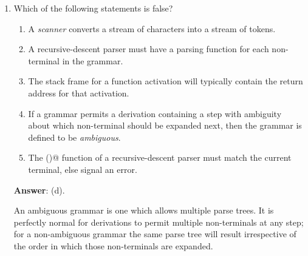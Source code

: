 \documentclass[12pt]{article}
\begin{document}
\begin{enumerate}
(a) and (c) cannot be acceptable since regexp's cannot describe
balanced constructs of arbitrary length, (d) does not allow $n = 0$
while (e) requires even $n$.

\item Which of the following statements is false?

\begin{enumerate}

\item A \textit{scanner} converts a stream of characters into a stream of tokens.

\item A recursive-descent parser must have a parsing function for each
  non-terminal in the grammar.

\item The stack frame for a function activation will typically contain
  the return address for that activation.

\item If a grammar permits a derivation containing a step with
  ambiguity about which non-terminal should be expanded next, then
  the grammar is defined to be \textit{ambiguous}.

\item The \verb@match()@ function of a recursive-descent parser must
match the current terminal, else signal an error.

\end{enumerate}

\textbf{Answer}: (d).

An ambiguous grammar is one which allows multiple parse trees.  It is
perfectly normal for derivations to permit multiple non-terminals at
any step; for a non-ambiguous grammar the same parse tree will result
irrespective of the order in which those non-terminals are expanded.

\end{enumerate}
\end{document}
